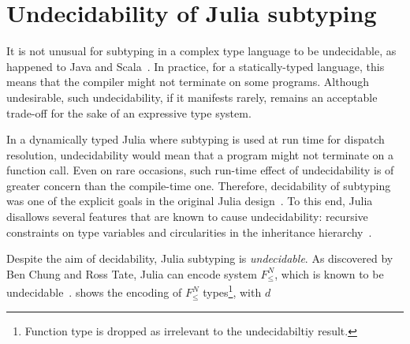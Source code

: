 \section{Undecidability of Julia subtyping}\label{sec:2:undecidable}

It is not unusual for subtyping in a complex type language to be undecidable,
as happened to Java and Scala~\cite{TODO}.
In practice, for a statically-typed language, this means that the
compiler might not terminate on some programs. Although undesirable,
such undecidability, if it manifests rarely, remains an acceptable trade-off
for the sake of an expressive type system.

In a dynamically typed Julia where subtyping is used at run time for dispatch
resolution, undecidability would mean that a program might not terminate
on a function call. Even on rare occasions, such run-time effect of
undecidability is of greater concern than the compile-time one.
Therefore, decidability of subtyping was one of the explicit goals
in the original Julia design~\cite{TODO}.
To this end, Julia disallows several features that are known to cause
undecidability: recursive constraints on type variables and
circularities in the inheritance hierarchy~\cite{TODO}.

Despite the aim of decidability, Julia subtyping is \emph{undecidable}.
As discovered by Ben Chung and Ross Tate, Julia can encode system
$F^N_{\leq}$, which is known to be undecidable~\cite{}.
 shows the encoding of $F^N_{\leq}$ types\footnote{Function
type is dropped as irrelevant to the undecidabiltiy result.},
with $d$ 
